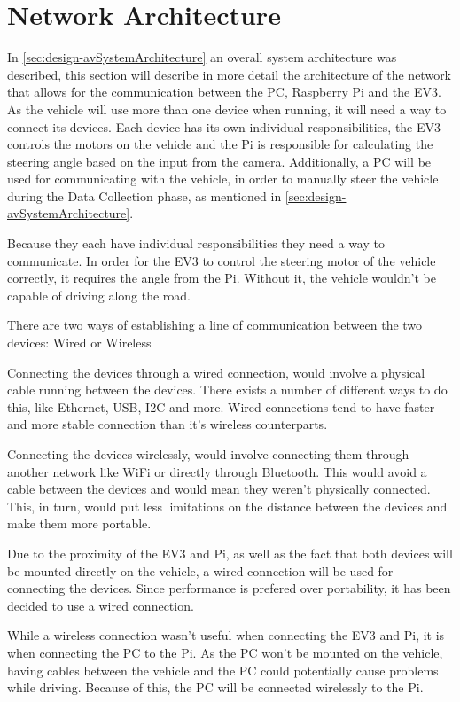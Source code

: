 \section{Network Architecture}\label{design:comPiEv3}
In \autoref{sec:design-avSystemArchitecture} an overall system architecture was described, this section will describe in more detail the architecture of the network that allows for the communication between the PC, Raspberry Pi and the EV3.
As the vehicle will use more than one device when running, it will need a way to connect its devices.
Each device has its own individual responsibilities, the EV3 controls the motors on the vehicle and the Pi is responsible for calculating the steering angle based on the input from the camera. 
Additionally, a PC will be used for communicating with the vehicle, in order to manually steer the vehicle during the Data Collection phase, as mentioned in \autoref{sec:design-avSystemArchitecture}.

Because they each have individual responsibilities they need a way to communicate.
In order for the EV3 to control the steering motor of the vehicle correctly, it requires the angle from the Pi.
Without it, the vehicle wouldn't be capable of driving along the road. 

There are two ways of establishing a line of communication between the two devices: Wired or Wireless

Connecting the devices through a wired connection, would involve a physical cable running between the devices. 
There exists a number of different ways to do this, like Ethernet, USB, I2C and more. 
Wired connections tend to have faster and more stable connection than it's wireless counterparts. 

Connecting the devices wirelessly, would involve connecting them through another network like WiFi or directly through Bluetooth.
This would avoid a cable between the devices and would mean they weren't physically connected.
This, in turn, would put less limitations on the distance between the devices and make them more portable.  

Due to the proximity of the EV3 and Pi, as well as the fact that both devices will be mounted directly on the vehicle, a wired connection will be used for connecting the devices. Since performance is prefered over portability, it has been decided to use a wired connection.

While a wireless connection wasn't useful when connecting the EV3 and Pi, it is when connecting the PC to the Pi.
As the PC won't be mounted on the vehicle, having cables between the vehicle and the PC could potentially cause problems while driving. 
Because of this, the PC will be connected wirelessly to the Pi. 

